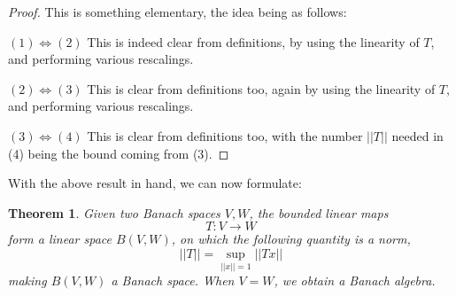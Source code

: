 \documentclass[12pt]{amsbook}
\newtheorem{theorem}{Theorem}[chapter]
\begin{document}
\begin{proof}
This is something elementary, the idea being as follows:

\medskip

$(1)\iff(2)$ This is indeed clear from definitions, by using the linearity of $T$, and performing various rescalings.

\medskip

$(2)\iff(3)$ This is clear from definitions too, again by using the linearity of $T$, and performing various rescalings.

\medskip

$(3)\iff(4)$ This is clear from definitions too, with the number $||T||$ needed in (4) being the bound coming from (3).
\end{proof}

With the above result in hand, we can now formulate:

\begin{theorem}
Given two Banach spaces $V,W$, the bounded linear maps 
$$T:V\to W$$
form a linear space $B(V,W)$, on which the following quantity is a norm,
$$||T||=\sup_{||x||=1}||Tx||$$
making $B(V,W)$ a Banach space. When $V=W$, we obtain a Banach algebra.
\end{theorem}
\end{document}
